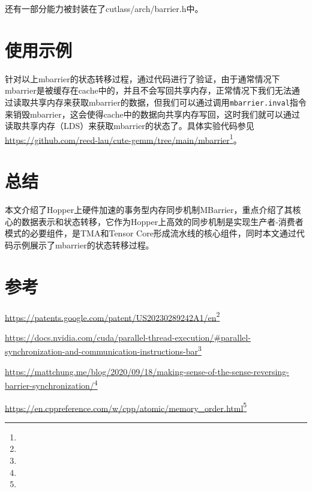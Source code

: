 还有一部分能力被封装在了cutlass/arch/barrier.h中。

\section{使用示例}

针对以上mbarrier的状态转移过程，通过代码进行了验证，由于通常情况下mbarrier是被缓存在cache中的，并且不会写回共享内存，正常情况下我们无法通过读取共享内存来获取mbarrier的数据，但我们可以通过调用\lstinline|mbarrier.inval|指令来销毁mbarrier，这会使得cache中的数据向共享内存写回，这时我们就可以通过读取共享内存（LDS）来获取mbarrier的状态了。具体实验代码参见\url{https://github.com/reed-lau/cute-gemm/tree/main/mbarrier}\footnote{\reedVIIIurlB}。

\section{总结}

本文介绍了Hopper上硬件加速的事务型内存同步机制MBarrier，重点介绍了其核心的数据表示和状态转移，它作为Hopper上高效的同步机制是实现生产者-消费者模式的必要组件，是TMA和Tensor Core形成流水线的核心组件，同时本文通过代码示例展示了mbarrier的状态转移过程。

\section{参考}

\url{https://patents.google.com/patent/US20230289242A1/en}\footnote{\reedVIIIurlC}

\url{https://docs.nvidia.com/cuda/parallel-thread-execution/#parallel-synchronization-and-communication-instructions-bar}\footnote{\reedVIIIurlA}

\url{https://mattchung.me/blog/2020/09/18/making-sense-of-the-sense-reversing-barrier-synchronization/}\footnote{\reedVIIIurlD}

\url{https://en.cppreference.com/w/cpp/atomic/memory_order.html}\footnote{\reedVIIIurlE}

